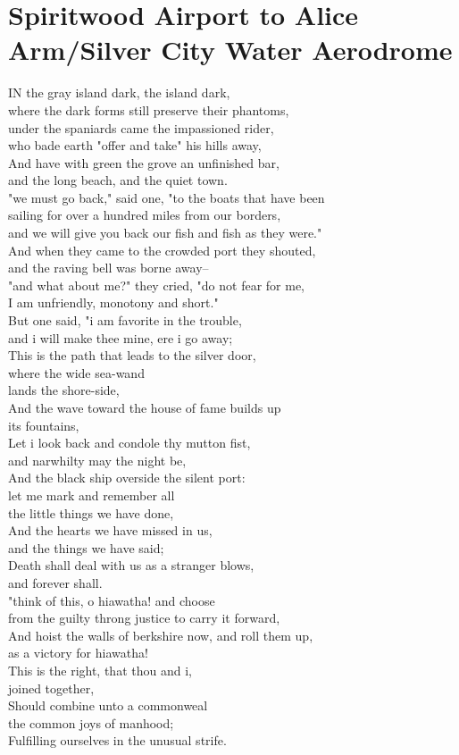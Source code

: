 \documentclass[smalldemyvopaper,11pt,twoside,onecolumn,openright,extrafontsizes]{memoir}
\begin{document}
\chapter{Spiritwood Airport to Alice Arm/Silver City Water Aerodrome}
IN the gray island dark, the island dark,
\\where the dark forms still preserve their phantoms,
\\under the spaniards came the impassioned rider,
\\who bade earth "offer and take" his hills away,
\\And have with green the grove an unfinished bar,
\\and the long beach, and the quiet town.
\\"we must go back," said one, "to the boats that have been
\\sailing for over a hundred miles from our borders,
\\and we will give you back our fish and fish as they were."
\\And when they came to the crowded port they shouted,
\\and the raving bell was borne away--
\\"and what about me?" they cried, "do not fear for me,
\\I am unfriendly, monotony and short."
\\But one said, "i am favorite in the trouble,
\\and i will make thee mine, ere i go away;
\\This is the path that leads to the silver door,
\\where the wide sea-wand
\\lands the shore-side,
\\And the wave toward the house of fame builds up
\\its fountains,
\\Let i look back and condole thy mutton fist,
\\and narwhilty may the night be,
\\And the black ship overside the silent port:
\\let me mark and remember all
\\the little things we have done,
\\And the hearts we have missed in us,
\\and the things we have said;
\\Death shall deal with us as a stranger blows,
\\and forever shall.
\\"think of this, o hiawatha! and choose
\\from the guilty throng justice to carry it forward,
\\And hoist the walls of berkshire now, and roll them up,
\\as a victory for hiawatha!
\\This is the right, that thou and i,
\\joined together,
\\Should combine unto a commonweal
\\the common joys of manhood;
\\Fulfilling ourselves in the unusual strife.
\end{document}
